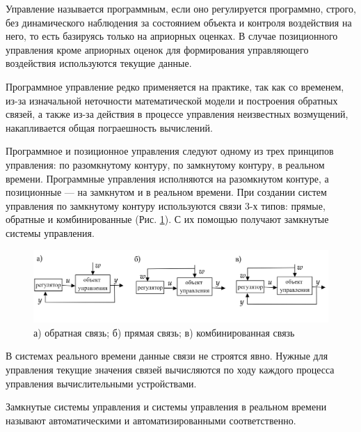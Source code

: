 Управление называется программным, если оно регулируется программно, строго, без динамического наблюдения за состоянием объекта и контроля воздействия на него, то есть базируясь только на априорных оценках. В случае позиционного управления кроме априорных оценок для формирования управляющего воздействия используются текущие данные.
	
	
Программное управление редко применяется на практике, так как со временем, из-за изначальной неточности математической модели и построения обратных связей, а также из-за действия в процессе управления неизвестных возмущений, накапливается общая пограешность вычислений. 


Программное и позиционное управления следуют одному из трех принципов управления: по разомкнутому контуру, по замкнутому контуру, в реальном времени. Программные управления исполняются на разомкнутом контуре, а позиционные --- на замкнутом и в реальном времени. При создании систем управления по замкнутому контуру используются связи 3-х типов: прямые, обратные и комбинированные (Рис. \ref{fig:1_2_1}). С их помощью получают замкнутые системы управления.


\begin{figure}[h]
	\includegraphics[width=\linewidth]{1_2_1.png}
  	\caption{а) обратная связь; б) прямая связь; в) комбинированная связь}
  	\label{fig:1_2_1}
\end{figure}


В системах реального времени данные связи не строятся явно. Нужные для управления текущие значения связей вычисляются по ходу каждого процесса управления вычислительными устройствами.




Замкнутые системы управления и системы управления в реальном времени называют автоматическими и автоматизированными соответственно.


